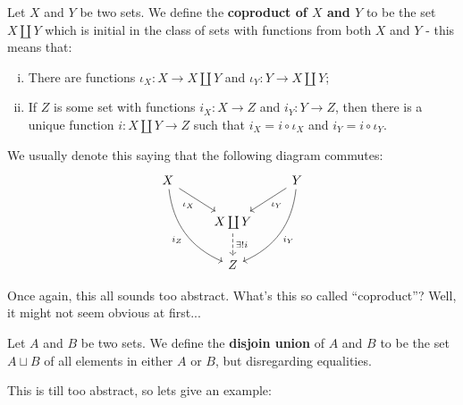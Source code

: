 \begin{df}
	Let $X$ and $Y$ be two sets. We define the \textbf{coproduct of $X$ and $Y$} to be the set $X\coprod Y$ which is initial in the class of sets with functions from both $X$ and $Y$ - this means that:
	\begin{enumerate}[i.]
		\item There are functions $\iota_X:X\to X\coprod Y$ and $\iota_Y:Y\to X\coprod Y$;
		\item If $Z$ is some set with functions $i_X:X\to Z$ and $i_Y:Y\to Z$, then there is a unique function $i:X\coprod Y\to Z$ such that $i_X=i\circ\iota_X$ and $i_Y=i\circ\iota_Y$.
	\end{enumerate}
\end{df}

We usually denote this saying that the following diagram commutes:
\[\begin{tikzcd}
X \arrow[rd, "\iota_X"'] \arrow[rdd, "i_Z"', bend right] &                                           & Y \arrow[ld, "\iota_Y"] \arrow[ldd, "i_Y", bend left] \\
& X\coprod Y \arrow[d, "\exists!i", dashed] &                                                       \\
& Z                                         &                                                      
\end{tikzcd}\]

Once again, this all sounds too abstract. What's this so called ``coproduct''? Well, it might not seem obvious at first...

\begin{df}
	Let $A$ and $B$ be two sets. We define the \textbf{disjoin union} of $A$ and $B$ to be the set $A\sqcup B$ of all elements in either $A$ or $B$, but disregarding equalities.
\end{df}

This is till too abstract, so lets give an example:

